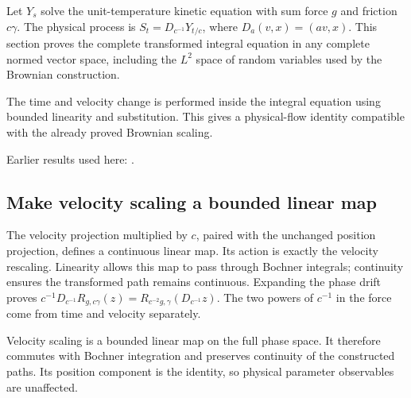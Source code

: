 \documentclass[11pt,a4paper]{report}
\begin{document}
Let \(Y_s\) solve the unit-temperature kinetic equation with sum force \(g\) and friction \(c\gamma\). The physical process is \(S_t=D_{c^{-1}}Y_{t/c}\), where \(D_a(v,x)=(av,x)\). This section proves the complete transformed integral equation in any complete normed vector space, including the \(L^{2}\) space of random variables used by the Brownian construction.



The time and velocity change is performed inside the integral equation using bounded linearity and substitution. This gives a physical-flow identity compatible with the already proved Brownian scaling.



Earlier results used here: \cite[Section~3.1]{LangevinLean2026Kinetic}.
\subsection{\texorpdfstring{Make velocity scaling a bounded linear map}{Make velocity scaling a bounded linear map}}
\label{report-step-KIPLMC-KineticClock-lean-1}


The velocity projection multiplied by \(c\), paired with the unchanged position projection, defines a continuous linear map. Its action is exactly the velocity rescaling. Linearity allows this map to pass through Bochner integrals; continuity ensures the transformed path remains continuous. Expanding the phase drift proves \(c^{-1}D_{c^{-1}}R_{g,c\gamma}(z)=R_{c^{-2}g,\gamma}(D_{c^{-1}}z)\). The two powers of \(c^{-1}\) in the force come from time and velocity separately.



Velocity scaling is a bounded linear map on the full phase space. It therefore commutes with Bochner integration and preserves continuity of the constructed paths. Its position component is the identity, so physical parameter observables are unaffected.
\end{document}
